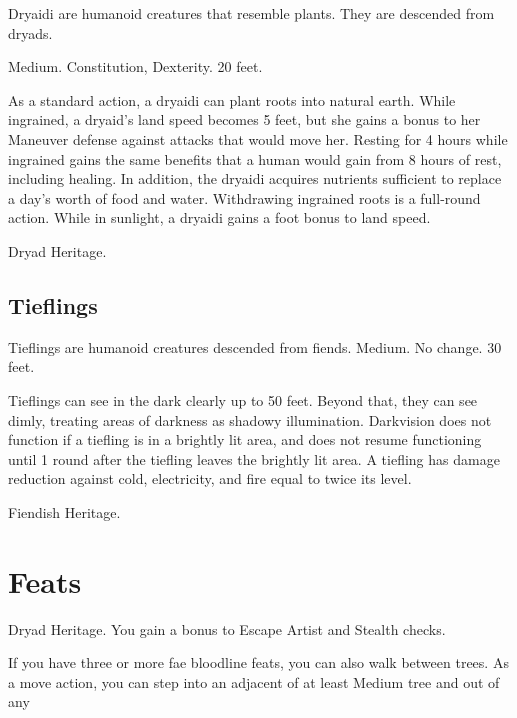 Dryaidi are humanoid creatures that resemble plants. They are descended from dryads.

 Medium.
  Constitution,  Dexterity.
 20 feet.
\begin{itemize}
     As a standard action, a dryaidi can plant roots into natural earth. While ingrained, a dryaid's land speed becomes 5 feet, but she gains a  bonus to her Maneuver defense against attacks that would move her. Resting for 4 hours while ingrained gains the same benefits that a human would gain from 8 hours of rest, including healing. In addition, the dryaidi acquires nutrients sufficient to replace a day's worth of food and water. Withdrawing ingrained roots is a full-round action.
     While in sunlight, a dryaidi gains a  foot bonus to land speed.
\end{itemize}
 Dryad Heritage.

\subsection{Tieflings}

Tieflings are humanoid creatures descended from fiends.
 Medium.
 No change.
 30 feet.
\begin{itemize}
     Tieflings can see in the dark clearly up to 50 feet. Beyond that, they can see dimly, treating areas of darkness as shadowy illumination. Darkvision does not function if a tiefling is in a brightly lit area, and does not resume functioning until 1 round after the tiefling leaves the brightly lit area.
     A tiefling has damage reduction against cold, electricity, and fire equal to twice its level.
\end{itemize}
 Fiendish Heritage.

\section{Feats}

\featpre Dryad Heritage.
\featben You gain a  bonus to Escape Artist and Stealth checks.

If you have three or more fae bloodline feats, you can also walk between trees. As a move action, you can step into an adjacent of at least Medium tree and out of any 

